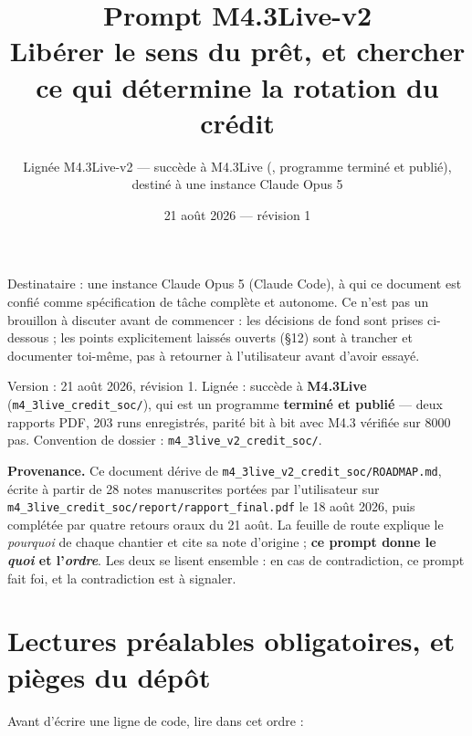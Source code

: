 \documentclass[11pt,a4paper]{article}
\title{Prompt M4.3Live-v2\\
\large Libérer le sens du prêt, et chercher ce qui détermine la rotation
du crédit}
\author{Lignée M4.3Live-v2 --- succède à M4.3Live
(\code{m4\_3live\_credit\_soc}, programme terminé et publié),\\
destiné à une instance Claude Opus 5}
\date{21 août 2026 --- révision 1}
\newcommand{\code}[1]{\texttt{#1}}
\begin{document}
\maketitle
\tableofcontents
\bigskip

Destinataire : une instance Claude Opus 5 (Claude Code), à qui ce document est confié comme spécification de tâche complète et autonome. Ce n'est pas un brouillon à discuter avant de commencer : les décisions de fond sont prises ci-dessous ; les points explicitement laissés ouverts (§12) sont à trancher et documenter toi-même, pas à retourner à l'utilisateur avant d'avoir essayé.

Version : 21 août 2026, révision 1. Lignée : succède à \textbf{M4.3Live} (\code{m4\_3live\_credit\_soc/}), qui est un programme \textbf{terminé et publié} --- deux rapports PDF, 203 runs enregistrés, parité bit à bit avec M4.3 vérifiée sur 8000 pas. Convention de dossier : \code{m4\_3live\_v2\_credit\_soc/}.

\textbf{Provenance.} Ce document dérive de \code{m4\_3live\_v2\_credit\_soc/ROADMAP.md}, écrite à partir de 28 notes manuscrites portées par l'utilisateur sur \code{m4\_3live\_credit\_soc/report/rapport\_final.pdf} le 18 août 2026, puis complétée par quatre retours oraux du 21 août. La feuille de route explique le \emph{pourquoi} de chaque chantier et cite sa note d'origine ; \textbf{ce prompt donne le \emph{quoi} et l'\emph{ordre}}. Les deux se lisent ensemble : en cas de contradiction, ce prompt fait foi, et la contradiction est à signaler.

\bigskip

\setcounter{section}{-1}
\section{Lectures préalables obligatoires, et pièges du dépôt}

Avant d'écrire une ligne de code, lire dans cet ordre :
\end{document}
